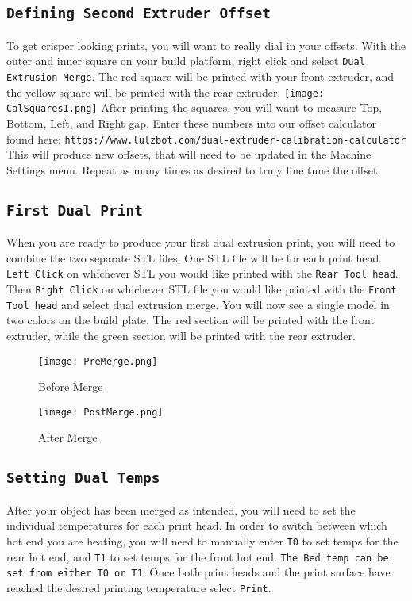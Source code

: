 \subsection{\texttt{Defining Second Extruder Offset}}
To get crisper looking prints, you will want to really dial in your offsets. With the outer and inner square on your build platform, right click and select \texttt{Dual Extrusion Merge}. The red square will be printed with your front extruder, and the yellow square will be printed with the rear extruder.
\texttt{[image: CalSquares1.png]}
After printing the squares, you will want to measure Top, Bottom, Left, and Right gap. Enter these numbers into our offset calculator found here: \texttt{https://www.lulzbot.com/dual-extruder-calibration-calculator} This will produce new offsets, that will need to be updated in the Machine Settings menu. Repeat as many times as desired to truly fine tune the offset. 

\subsection{\texttt{First Dual Print}}
When you are ready to produce your first dual extrusion print, you will need to combine the two separate STL files. One STL file will be for each print head. \texttt{Left Click} on whichever STL you would like printed with the \texttt{Rear Tool head}. Then \texttt{Right Click} on whichever STL file you would like printed with the \texttt{Front Tool head} and select dual extrusion merge. You will now see a single model in two colors on the build plate. The red section will be printed with the front extruder, while the green section will be printed with the rear extruder. 

\begin{figure}[H]
\centering
\texttt{[image: PreMerge.png]}
\caption{Before Merge}
\label{fig:Before Merge}
\end{figure}

\begin{figure}[H]
\centering
\texttt{[image: PostMerge.png]}
\caption{After Merge}
\label{fig:After Merge}
\end{figure}

\subsection{\texttt{Setting Dual Temps}}
After your object has been merged as intended, you will need to set the individual temperatures for each print head. In order to switch between which hot end you are heating, you will need to manually enter \texttt{T0} to set temps for the rear hot end, and \texttt{T1} to set temps for the front hot end. \texttt{The Bed temp can be set from either T0 or T1}. Once both print heads and the print surface have reached the desired printing temperature select \texttt{Print}.

